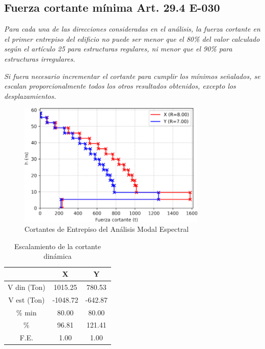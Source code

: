 \documentclass{article}%
\begin{document}
%
\subsection{Fuerza cortante mínima Art. 29.4 E{-}030}%
\label{subsec:FuerzacortantemnimaArt.29.4E{-}030}%
\begin{tcolorbox}[colback=gray!5!white,colframe=cyan!75!black,fonttitle=\bfseries,title=Art. 29.4.1]%
\textit{Para cada una de las direcciones consideradas en el análisis, la fuerza cortante en el primer entrepiso del edificio no puede ser menor que el 80\% del valor calculado según el artículo 25 para estructuras regulares, ni menor que el 90\% para estructuras irregulares.}%
\end{tcolorbox}%
\begin{tcolorbox}[colback=gray!5!white,colframe=cyan!75!black,fonttitle=\bfseries,title=Art. 29.4.2]%
\textit{Si fuera necesario incrementar el cortante para cumplir los mínimos señalados,  se escalan proporcionalmente todos los otros resultados obtenidos, excepto los  desplazamientos.}%
\end{tcolorbox}%


\begin{figure}[ht!]%
\includegraphics[width=0.8\textwidth]{images/cortantes}%
\caption{Cortantes de Entrepiso del Análisis Modal Espectral}%
\label{fig:corte_basal}%
\end{figure}

%


\begin{table}[H]%
\centering%
\caption{Escalamiento de la cortante dinámica}%
\begin{tabular}{ccc}
\toprule
 & X & Y \\
\midrule
V din (Ton) & 1015.25 & 780.53 \\
V est (Ton) & -1048.72 & -642.87 \\
\% min & 80.00 & 80.00 \\
\% & 96.81 & 121.41 \\
F.E. & 1.00 & 1.00 \\
\bottomrule
\end{tabular}
%
\end{table}
\end{document}
